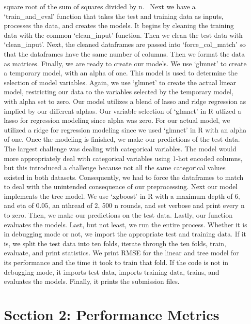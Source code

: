 \documentclass[
]{article}
\begin{document}
square root of the sum of squares divided by n.~ Next we have a
`train\_and\_eval' function that takes the test and training data as
inputs, processes the data, and creates the models. It begins by
cleaning the training data with the common `clean\_input' function. Then
we clean the test data with `clean\_input'. Next, the cleaned dataframes
are passed into `force\_col\_match' so that the dataframes have the same
number of columns. Then we format the data as matrices. Finally, we are
ready to create our models. We use `glmnet' to create a temporary model,
with an alpha of one. This model is used to determine the selection of
model variables. Again, we use `glmnet' to create the actual linear
model, restricting our data to the variables selected by the temporary
model, with alpha set to zero. Our model utilizes a blend of lasso and
ridge regression as implied by our different alphas. Our variable
selection of `glmnet' in R utlized a lasso for regression modeling since
alpha was zero. For our actual model, we utilized a ridge for regression
modeling since we used `glmnet' in R with an alpha of one. Once the
modeling is finished, we make our predictions of the test data. The
largest challenge was dealing with categorical variables. The model
would more appropriately deal with categorical variables using 1-hot
encoded columns, but this introduced a challenge because not all the
same categorical values existed in both datasets. Consequently, we had
to force the dataframes to match to deal with the unintended consequence
of our preprocessing. Next our model implements the tree model. We use
`xgboost' in R with a maximum depth of 6, and eta of 0.05, an nthread of
2, 500 n rounds, and set verbose and print every n to zero. Then, we
make our predictions on the test data. Lastly, our function evaluates
the models. Last, but not least, we run the entire process. Whether it
is in debugging mode or not, we import the appropriate test and training
data. If it is, we split the test data into ten folds, iterate through
the ten folds, train, evaluate, and print statistics. We print RMSE for
the linear and tree model for its performance and the time it took to
train that fold. If the code is not in debugging mode, it imports test
data, imports training data, trains, and evaluates the models. Finally,
it prints the submission files.

\hypertarget{section-2-performance-metrics}{%
\section{Section 2: Performance
Metrics}\label{section-2-performance-metrics}}
\end{document}
